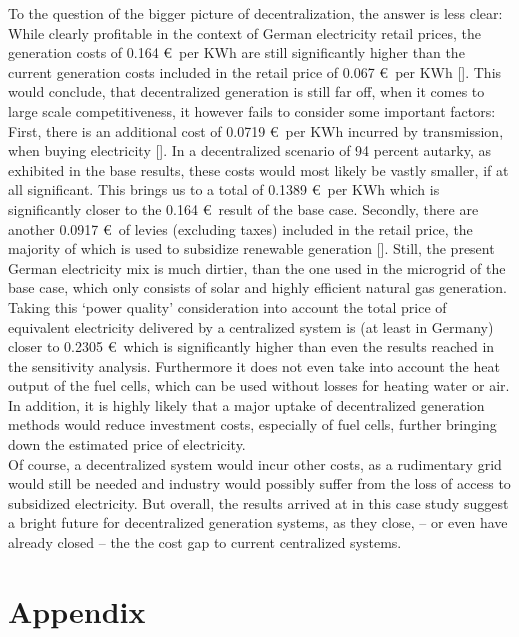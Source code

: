 \documentclass[
	11pt,								%
	DIV10,								%
	a4paper,         					%
	oneside,							%
	headheight=20pt,					%
	footheight=20pt,					%
    parskip=full,						%
    listof=totoc,						%
	bibliography=totoc,					%
	index=totoc,						%
]{scrartcl}
\begin{document}
To the question of the bigger picture of decentralization, the answer is less clear: While clearly profitable in the context of German electricity retail prices, the generation costs of 0.164 \euro\ per KWh are still significantly higher than the current generation costs included in the retail price of 0.067 \euro\ per KWh [\cite{Monitoringbericht20182018}]. This would conclude, that decentralized generation is still far off, when it comes to large scale competitiveness, it however fails to consider some important factors: First, there is an additional cost of 0.0719 \euro\ per KWh incurred by transmission, when buying electricity [\cite{Monitoringbericht20182018}]. 
In a decentralized scenario of 94 percent autarky, as exhibited in the base results, these costs would most likely be vastly smaller, if at all significant. This brings us to a total of 0.1389 \euro\ per KWh which is significantly closer to the 0.164 \euro\ result of the base case. Secondly, there are another 0.0917 \euro\ of levies (excluding taxes) included in the retail price, the majority of which is used to subsidize renewable generation [\cite{Monitoringbericht20182018}]. Still, the present German electricity mix is much dirtier, than the one used in the microgrid of the base case, which only consists of solar and highly efficient natural gas generation. 
Taking this `power quality' consideration into account the total price of equivalent electricity delivered by a centralized system is (at least in Germany) closer to 0.2305 \euro\, which is significantly higher than even the results reached in the sensitivity analysis. Furthermore it does not even take into account the heat output of the fuel cells, which can be used without losses for heating water or air.\\
	In addition, it is highly likely that a major uptake of decentralized generation methods would reduce investment costs, especially of fuel cells, further bringing down the estimated price of electricity. \\
	Of course, a decentralized system would incur other costs, as a rudimentary grid would still be needed and industry would possibly suffer from the loss of access to subsidized electricity. 
	But overall, the results arrived at in this case study suggest a bright future for decentralized generation systems, as they close, – or even have already closed – the the cost gap to current centralized systems.

\newpage
{}	

\section{Appendix}
\end{document}
